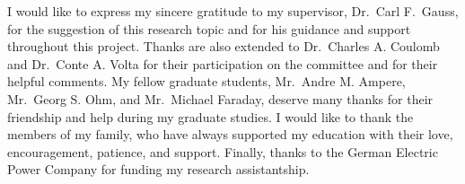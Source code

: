 %
\fancyhf{}
\cfoot{\thepage}
\chead{\th}
%
\SgAddTitle%
\SgAddApproval%
\SgAddStatement%
%
\begin{acknowledgments}
I would like to express my sincere gratitude to my supervisor,
Dr.\ Carl F.\ Gauss, for the suggestion of this research topic and for his
guidance and support throughout this project.
Thanks are also extended to Dr.\ Charles A. Coulomb and Dr.\ Conte A. Volta
for their participation on the committee and for their helpful comments.
My fellow graduate students, Mr.\ Andre M. Ampere, Mr.\ Georg S. Ohm, and
Mr.\ Michael Faraday, deserve many thanks for their friendship and help during
my graduate studies.
I would like to thank the members of my family, who have always supported my
education with their love, encouragement, patience, and support.
Finally, thanks to the German Electric Power Company for funding my research
assistantship.
\end{acknowledgments}
%
\SgAddToc%
\SgAddLof%
\SgAddLot%
\SgAddLoa%
